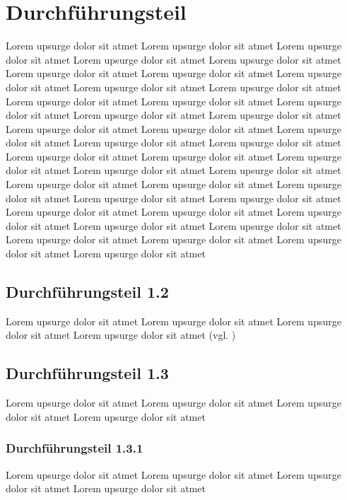 \section{Durchführungsteil}

Lorem upsurge dolor sit atmet Lorem upsurge dolor sit atmet Lorem upsurge dolor sit atmet Lorem upsurge dolor sit atmet Lorem upsurge dolor sit atmet Lorem upsurge dolor sit atmet Lorem upsurge dolor sit atmet Lorem upsurge dolor sit atmet Lorem upsurge dolor sit atmet Lorem upsurge dolor sit atmet Lorem upsurge dolor sit atmet Lorem upsurge dolor sit atmet Lorem upsurge dolor sit atmet Lorem upsurge dolor sit atmet Lorem upsurge dolor sit atmet Lorem upsurge dolor sit atmet Lorem upsurge dolor sit atmet Lorem upsurge dolor sit atmet Lorem upsurge dolor sit atmet Lorem upsurge dolor sit atmet Lorem upsurge dolor sit atmet Lorem upsurge dolor sit atmet Lorem upsurge dolor sit atmet Lorem upsurge dolor sit atmet Lorem upsurge dolor sit atmet Lorem upsurge dolor sit atmet Lorem upsurge dolor sit atmet Lorem upsurge dolor sit atmet Lorem upsurge dolor sit atmet Lorem upsurge dolor sit atmet Lorem upsurge dolor sit atmet Lorem upsurge dolor sit atmet Lorem upsurge dolor sit atmet Lorem upsurge dolor sit atmet Lorem upsurge dolor sit atmet Lorem upsurge dolor sit atmet Lorem upsurge dolor sit atmet Lorem upsurge dolor sit atmet Lorem upsurge dolor sit atmet 

\subsection{Durchführungsteil 1.2}
Lorem upsurge dolor sit atmet Lorem upsurge dolor sit atmet Lorem upsurge dolor sit atmet Lorem upsurge dolor sit atmet (vgl. \cite{samplebook})
\subsection{Durchführungsteil 1.3}
Lorem upsurge dolor sit atmet Lorem upsurge dolor sit atmet Lorem upsurge dolor sit atmet Lorem upsurge dolor sit atmet
\subsubsection{Durchführungsteil 1.3.1}
Lorem upsurge dolor sit atmet Lorem upsurge dolor sit atmet Lorem upsurge dolor sit atmet Lorem upsurge dolor sit atmet